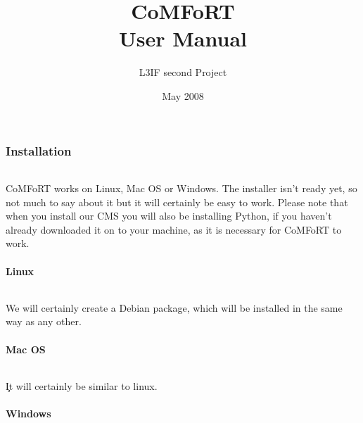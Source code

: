\documentclass{article}
\title{\Huge CoMFoRT \\
       \huge User Manual}
\author{L3IF second Project}
\date{May 2008}
\begin{document}
  \maketitle
  \clearpage
  \tableofcontents
  \clearpage

\part*{}
\section{Installation}

    \paragraph{}
    CoMFoRT works on Linux, Mac OS or Windows. The installer isn't ready yet, so not much to say about it but it will certainly be easy to work. Please note that when you install our CMS you will also be installing Python, if you haven't already downloaded it on to your machine, as it is necessary for CoMFoRT to work. 
  \subsection{Linux}
    \paragraph{}
    We will certainly create a Debian package, which will be installed in the same way as any other.
  \subsection{Mac OS}
    \paragraph{}\c 
    It will certainly be similar to linux. 
  \subsection{Windows}
\end{document}
